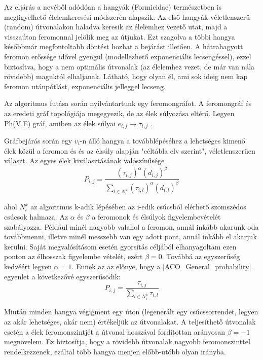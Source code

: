 Az eljárás a nevéből adódóan a hangyák (Formicidae) természetben is megfigyelhető élelemkeresési módszerén alapszik. Az első hangyák véletlenszerű (random) útvonalakon haladva keresik az élelemhez vezető utat, majd a visszaúton feromonnal jelölik meg az útjukat. Ezt szagolva a többi hangya későbbmár megfontoltabb döntést hozhat a bejárást illetően. A hátrahagyott feromon erőssége idővel gyengül (modellezhető exponenciális lecsengéssel), ezzel biztosítva, hogy a nem optimális útvonalak (az élelemhez vezet, de már van nála rövidebb) maguktól elhaljanak. Látható, hogy olyan él, ami sok ideig nem kap feromon utánpótlást, exponenciális jelleggel lecseng.

Az algoritmus futása során nyilvántartunk egy feromongráfot. A feromongráf és az eredeti gráf topológiája megegyezik, de az élek súlyozása eltérő. Legyen Ph(V,E) gráf, amiben az élek súlyai \( e_{i,j} \rightarrow \tau_{i,j} \) .

Gráfbejárás során egy \(v_i\)-n álló hangya a továbblépéséhez a lehetséges kimenő élek közül a feromon és és az élsúly alapján "céltábla elv szerint", véletlenszerűen választ. Az egyes élek kiválasztásának valószínűsége
\begin{equation}
	P_{i,j} = \frac{(\tau_{i,j})^\alpha(d_{i,j})^\beta}{\sum_{l \in N_i^k}(\tau_{i,l})^\alpha(d_{i,l})^\beta }
	\label{ACO_General_probability}
\end{equation}


ahol \(N_i^k \) az algoritmus k-adik lépésében az i-edik csúcsból elérhető szomszédos csúcsok halmaza. Az \(\alpha\) és \(\beta\) a feromonok és élsúlyok figyelembevételét szabályozza. Például minél nagyobb valahol a feromon, annál inkább akarunk oda továbbmenni, illetve minél messzebb van egy adott pont, annál inkább el akarjuk kerülni. Saját megvalósításom esetén gyorsítás céljából elhanyagoltam ezen ponton az élhosszak figyelembe vételét, ezért \(\beta = 0\). Továbbá az egyszerűség kedvéért legyen \(\alpha = 1\). Ennek az az előnye, hogy a \ref{ACO_General_probability}. egyenlet a következővé egyszerűsödik:
\begin{equation}
	P_{i,j} = \frac{\tau_{i,j}}{\sum_{l \in N_i^k}\tau_{i,l}}
	\label{ACO_My_probability}
\end{equation}

Miután minden hangya végigment egy úton (legenerált egy csúcssorrendet, legyen az akár lehetséges, akár nem) értékeljük az útvonalakat. A teljesíthető útvonalak esetén a élek feromonszintjét a útvonal hosszával fordítottan arányosan \(\beta = -1\) megnövelem. Ez biztosítja, hogy a rövidebb útvonalak nagyobb feromonszinttel rendelkezzenek, ezáltal több hangya menjen előbb-utóbb olyan irányba. 

